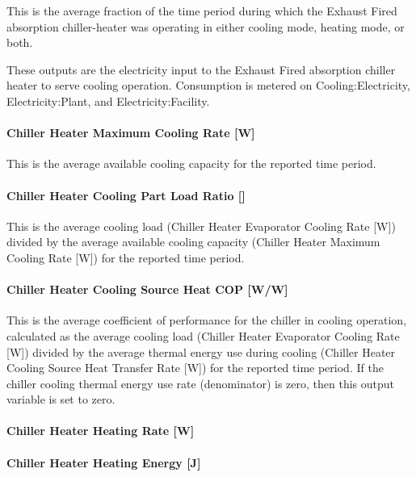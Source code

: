 This is the average fraction of the time period during which the Exhaust Fired absorption chiller-heater was operating in either cooling mode, heating mode, or both.

These outputs are the electricity input to the Exhaust Fired absorption chiller heater to serve cooling operation. Consumption is metered on Cooling:Electricity, Electricity:Plant, and Electricity:Facility.

\paragraph{Chiller Heater Maximum Cooling Rate {[}W{]}}\label{chiller-heater-maximum-cooling-rate-w}

This is the average available cooling capacity for the reported time period.

\paragraph{Chiller Heater Cooling Part Load Ratio {[]}}\label{chiller-heater-cooling-part-load-ratio-1}

This is the average cooling load (Chiller Heater Evaporator Cooling Rate {[}W{]}) divided by the average available cooling capacity (Chiller Heater Maximum Cooling Rate {[}W{]}) for the reported time period.

\paragraph{Chiller Heater Cooling Source Heat COP {[}W/W{]}}\label{chiller-heater-cooling-source-heat-cop-ww}

This is the average coefficient of performance for the chiller in cooling operation, calculated as the average cooling load (Chiller Heater Evaporator Cooling Rate {[}W{]}) divided by the average thermal energy use during cooling (Chiller Heater Cooling Source Heat Transfer Rate {[}W{]}) for the reported time period. If the chiller cooling thermal energy use rate (denominator) is zero, then this output variable is set to zero.

\paragraph{Chiller Heater Heating Rate {[}W{]}}\label{chiller-heater-heating-rate-w-2}

\paragraph{Chiller Heater Heating Energy {[}J{]}}\label{chiller-heater-heating-energy-j-1}

